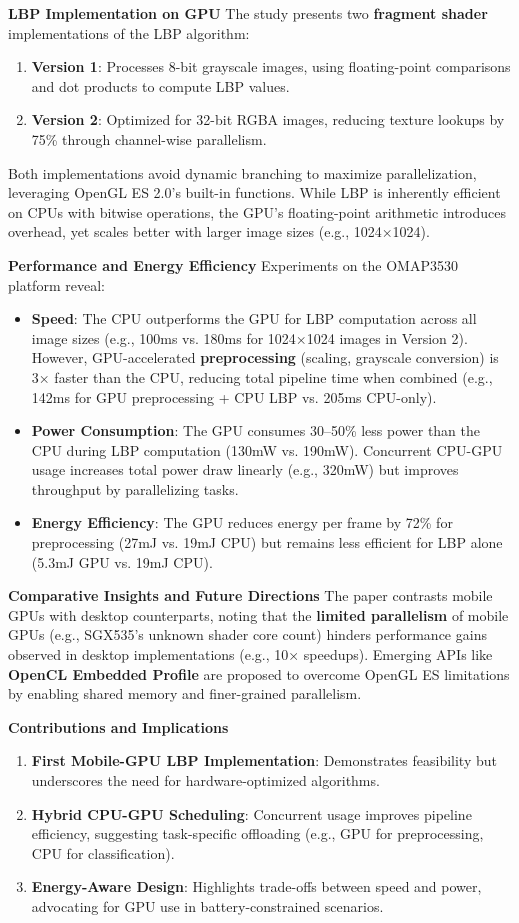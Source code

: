 \documentclass[conference]{IEEEtran}
\begin{document}
\textbf{LBP Implementation on GPU}  
The study presents two \textbf{fragment shader} implementations of the LBP algorithm:
\begin{enumerate}
    \item \textbf{Version 1}: Processes 8-bit grayscale images, using floating-point comparisons and dot products to compute LBP values.
    \item \textbf{Version 2}: Optimized for 32-bit RGBA images, reducing texture lookups by 75\% through channel-wise parallelism.
\end{enumerate}
Both implementations avoid dynamic branching to maximize parallelization, leveraging OpenGL ES 2.0’s built-in functions. While LBP is inherently efficient on CPUs with bitwise operations, the GPU’s floating-point arithmetic introduces overhead, yet scales better with larger image sizes (e.g., 1024×1024).

\textbf{Performance and Energy Efficiency}  
Experiments on the OMAP3530 platform reveal:
\begin{itemize}
    \item \textbf{Speed}: The CPU outperforms the GPU for LBP computation across all image sizes (e.g., 100ms vs. 180ms for 1024×1024 images in Version 2). However, GPU-accelerated \textbf{preprocessing} (scaling, grayscale conversion) is 3× faster than the CPU, reducing total pipeline time when combined (e.g., 142ms for GPU preprocessing + CPU LBP vs. 205ms CPU-only).
    \item \textbf{Power Consumption}: The GPU consumes 30–50\% less power than the CPU during LBP computation (130mW vs. 190mW). Concurrent CPU-GPU usage increases total power draw linearly (e.g., 320mW) but improves throughput by parallelizing tasks.
    \item \textbf{Energy Efficiency}: The GPU reduces energy per frame by 72\% for preprocessing (27mJ vs. 19mJ CPU) but remains less efficient for LBP alone (5.3mJ GPU vs. 19mJ CPU).
\end{itemize}

\textbf{Comparative Insights and Future Directions}  
The paper contrasts mobile GPUs with desktop counterparts, noting that the \textbf{limited parallelism} of mobile GPUs (e.g., SGX535’s unknown shader core count) hinders performance gains observed in desktop implementations (e.g., 10× speedups). Emerging APIs like \textbf{OpenCL Embedded Profile} are proposed to overcome OpenGL ES limitations by enabling shared memory and finer-grained parallelism.

\textbf{Contributions and Implications}  
\begin{enumerate}
    \item \textbf{First Mobile-GPU LBP Implementation}: Demonstrates feasibility but underscores the need for hardware-optimized algorithms.
    \item \textbf{Hybrid CPU-GPU Scheduling}: Concurrent usage improves pipeline efficiency, suggesting task-specific offloading (e.g., GPU for preprocessing, CPU for classification).
    \item \textbf{Energy-Aware Design}: Highlights trade-offs between speed and power, advocating for GPU use in battery-constrained scenarios.
\end{enumerate}
\end{document}

